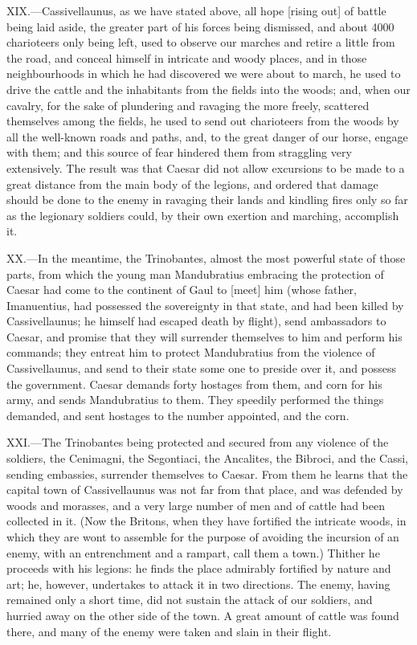 XIX.—Cassivellaunus, as we have stated above, all hope [rising out] of
battle being laid aside, the greater part of his forces being dismissed,
and about 4000 charioteers only being left, used to observe our marches
and retire a little from the road, and conceal himself in intricate and
woody places, and in those neighbourhoods in which he had discovered we
were about to march, he used to drive the cattle and the inhabitants
from the fields into the woods; and, when our cavalry, for the sake of
plundering and ravaging the more freely, scattered themselves among the
fields, he used to send out charioteers from the woods by all the
well-known roads and paths, and, to the great danger of our horse, engage
with them; and this source of fear hindered them from straggling very
extensively. The result was that Caesar did not allow excursions to be
made to a great distance from the main body of the legions, and ordered
that damage should be done to the enemy in ravaging their lands and
kindling fires only so far as the legionary soldiers could, by their own
exertion and marching, accomplish it.

XX.—In the meantime, the Trinobantes, almost the most powerful state of
those parts, from which the young man Mandubratius embracing the
protection of Caesar had come to the continent of Gaul to [meet] him
(whose father, Imanuentius, had possessed the sovereignty in that state,
and had been killed by Cassivellaunus; he himself had escaped death by
flight), send ambassadors to Caesar, and promise that they will
surrender themselves to him and perform his commands; they entreat him
to protect Mandubratius from the violence of Cassivellaunus, and send to
their state some one to preside over it, and possess the government.
Caesar demands forty hostages from them, and corn for his army, and
sends Mandubratius to them. They speedily performed the things demanded,
and sent hostages to the number appointed, and the corn.

XXI.—The Trinobantes being protected and secured from any violence of
the soldiers, the Cenimagni, the Segontiaci, the Ancalites, the Bibroci,
and the Cassi, sending embassies, surrender themselves to Caesar. From
them he learns that the capital town of Cassivellaunus was not far from
that place, and was defended by woods and morasses, and a very large
number of men and of cattle had been collected in it. (Now the Britons,
when they have fortified the intricate woods, in which they are wont to
assemble for the purpose of avoiding the incursion of an enemy, with an
entrenchment and a rampart, call them a town.) Thither he proceeds with
his legions: he finds the place admirably fortified by nature and art;
he, however, undertakes to attack it in two directions. The enemy,
having remained only a short time, did not sustain the attack of our
soldiers, and hurried away on the other side of the town. A great amount
of cattle was found there, and many of the enemy were taken and slain in
their flight.

